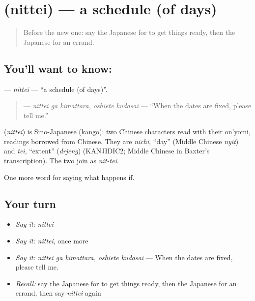 \section[\texorpdfstring{\ja{にってい} (nittei)}{にってい (nittei)}]{ (nittei) — a schedule (of days)}

\label{lesson:JA-C344-nittei}



\begin{quote}
Before the new one: say the Japanese for to get things ready, then the Japanese for an errand.
\end{quote}

\subsection*{You'll want to know: }
\textbf{} — \emph{nittei} — \textquotedblleft{}a schedule (of days)\textquotedblright{}.

\begin{quote}
\textbf{  } — \emph{nittei ga kimattara, oshiete kudasai} — \textquotedblleft{}When the dates are fixed, please tell me.\textquotedblright{}
\end{quote}

\begin{cousinweb}
\textbf{} (\emph{nittei}) is Sino-Japanese (kango): two Chinese characters read with their on'yomi, readings borrowed from Chinese. They are \emph{nichi}, \textquotedblleft{}day\textquotedblright{} (Middle Chinese \emph{nyit}) and \emph{tei}, \textquotedblleft{}extent\textquotedblright{} (\emph{drjeng}) (KANJIDIC2; Middle Chinese in Baxter's transcription). The two join as \emph{nit-tei}.
\end{cousinweb}

\begin{grammarlens}[title={What you've built}]
One more word for saying what happens if.
\end{grammarlens}

\subsection*{Your turn}
\begin{itemize}
\raggedright
  \item \emph{Say it:} \emph{nittei}
  \item \emph{Say it:} \emph{nittei}, once more
  \item \emph{Say it:} \emph{nittei ga kimattara, oshiete kudasai} — When the dates are fixed, please tell me.
  \item \emph{Recall:} say the Japanese for to get things ready, then the Japanese for an errand, then say \emph{nittei} again
\end{itemize}

